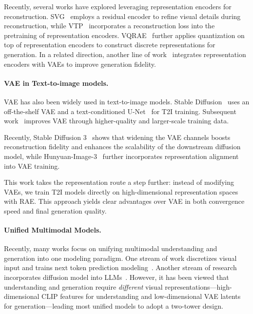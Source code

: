 \documentclass[10pt,twocolumn,letterpaper]{article}
\begin{document}
Recently, several works have explored leveraging representation encoders for reconstruction. SVG~\citep{svg, svg-t2i} employs a residual encoder to refine visual details during reconstruction, while VTP~\citep{VTP} incorporates a reconstruction loss into the pretraining of representation encoders. VQRAE~\citep{vqrae} further applies quantization on top of representation encoders to construct discrete representations for generation. In a related direction, another line of work~\citep{reglue,redi,semvae} integrates representation encoders with VAEs to improve generation fidelity.

\paragraph{VAE in Text-to-image models.}
VAE has also been widely used in text-to-image models. Stable Diffusion~\citep{LDM} uses an off-the-shelf VAE and a text-conditioned U-Net~\citep{unet} for T2I training. Subsequent work~\citep{podell2023sdxl, SD3,flux} improves VAE through higher-quality and larger-scale training data. 

Recently, Stable Diffusion 3~\citep{SD3} shows that widening the VAE channels boosts reconstruction fidelity and enhances the scalability of the downstream diffusion model, while Hunyuan-Image-3~\citep{cao2025hunyuanimage} further incorporates representation alignment~\citep{repa} into VAE training.

This work takes the representation route a step further: instead of modifying VAEs, we train T2I models directly on high-dimensional representation spaces with RAE. This approach yields clear advantages over VAE in both convergence speed and final generation quality.



\paragraph{Unified Multimodal Models.} 
Recently, many works focus on unifying multimodal understanding and generation into one modeling paradigm. 
One stream of work discretizes visual input and trains next token prediction modeling~\cite{team2024chameleon,wang2024emu3,chen2025janus, wu2024vila,jiao2025unitoken}.
Another stream of research incorporates diffusion model into LLMs~\cite{dai2023emu,dong2023dreamllm,emu2,ge2024seed,metamorph,zhou2024transfusion, metaquery,blip3o,deng2025emerging}.  However, it has been viewed that understanding and generation require \emph{different} visual representations---high-dimensional CLIP features for understanding and low-dimensional VAE latents for generation---leading most unified models to adopt a two-tower design.
\end{document}

